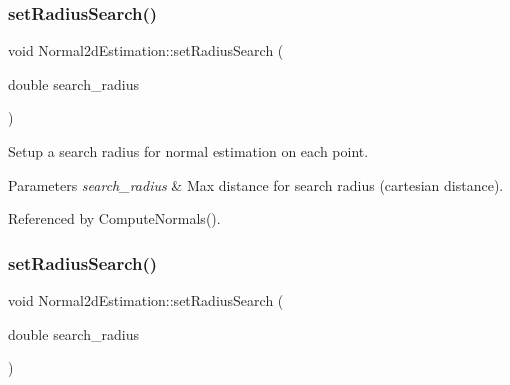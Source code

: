 \subsubsection{\texorpdfstring{set\+Radius\+Search()}{setRadiusSearch()}\hspace{0.1cm}{\footnotesize\ttfamily [1/2]}}
{\footnotesize\ttfamily void Normal2d\+Estimation\+::set\+Radius\+Search (\begin{DoxyParamCaption}\item[{double}]{search\+\_\+radius }\end{DoxyParamCaption})\hspace{0.3cm}{\ttfamily [inline]}}



Setup a search radius for normal estimation on each point. 


\begin{DoxyParams}{Parameters}
{\em search\+\_\+radius} & Max distance for search radius (cartesian distance). \\
\hline
\end{DoxyParams}


Referenced by Compute\+Normals().

\mbox{\label{classNormal2dEstimation_aebdbc9d5d5cabd269522f42af9d1552f}} 
\subsubsection{\texorpdfstring{set\+Radius\+Search()}{setRadiusSearch()}\hspace{0.1cm}{\footnotesize\ttfamily [2/2]}}
{\footnotesize\ttfamily void Normal2d\+Estimation\+::set\+Radius\+Search (\begin{DoxyParamCaption}\item[{double}]{search\+\_\+radius }\end{DoxyParamCaption})\hspace{0.3cm}{\ttfamily [inline]}}

\mbox{\label{classNormal2dEstimation_a87261649c17ea4f561da89066591a900}} 
